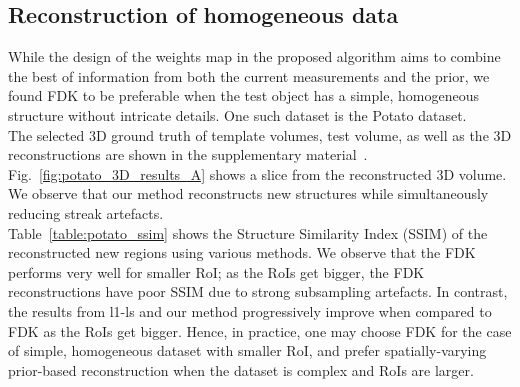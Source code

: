 \documentclass[journal]{IEEEtran}
\begin{document}
\subsection{Reconstruction of homogeneous data}
\label{Sec:potato}
While the design of the weights map in the proposed algorithm aims to combine the best of information from both the current measurements and the prior, we found FDK to be preferable when the test object has a simple, homogeneous structure without intricate details. One such dataset is the Potato dataset.\\
 The selected 3D
ground truth of template volumes, test volume, as well as the 3D reconstructions are shown in the supplementary material~\cite{supp_paper}. Fig.~\ref{fig:potato_3D_results_A} shows a slice from the reconstructed 3D volume. We observe that our method reconstructs new structures while simultaneously reducing streak artefacts.\\ %
Table~\ref{table:potato_ssim} shows the Structure Similarity Index (SSIM) of the reconstructed new regions using various methods. We observe that the FDK performs very well for smaller RoI; as the RoIs get bigger, the FDK reconstructions have poor SSIM due to strong subsampling artefacts. In contrast, the results from l1-ls and our method progressively improve when compared to FDK as the RoIs get bigger. Hence, in practice, one may choose FDK for the case of simple, homogeneous dataset with smaller RoI,  and prefer spatially-varying prior-based reconstruction when the dataset is complex and RoIs are larger.
\end{document}
